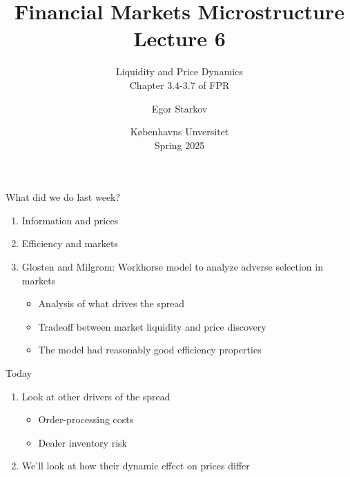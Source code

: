 \documentclass[english,10pt
,aspectratio=169
]{beamer}
\title{Financial Markets Microstructure \\ Lecture 6}
\subtitle{Liquidity and Price Dynamics\\
Chapter 3.4-3.7 of FPR}
\author{Egor Starkov}
\date{K{\o}benhavns Unversitet \\
	Spring 2025}
\begin{document}
	

\frame[plain]{\titlepage}



\begin{frame}{What did we do last week?}
\begin{enumerate}
	\item Information and prices
	\item Efficiency and markets
	\item Glosten and Milgrom: Workhorse model to analyze adverse selection in markets
	\begin{itemize}
	\item Analysis of what drives the spread
	\item Tradeoff between market liquidity and price discovery
	\item The model had reasonably good efficiency properties
	\end{itemize}
\end{enumerate}
\end{frame}




\begin{frame}{Today}
\begin{enumerate}
	\item Look at other drivers of the spread
	\begin{itemize}
		\item Order-processing costs
		\item Dealer inventory risk
	\end{itemize}
	\item We'll look at how their dynamic effect on prices differ
\end{enumerate}
\end{frame}
\end{document}
